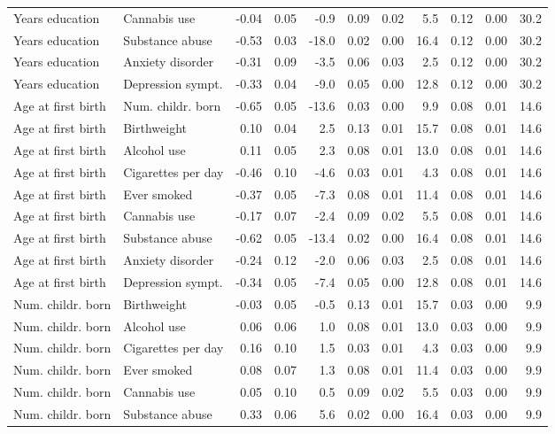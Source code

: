 {\begin{longtable}{llrrrrrrrrr}
  Years education & Cannabis use & -0.04 & 0.05 & -0.9 & 0.09 & 0.02 & 5.5 & 0.12 & 0.00 & 30.2 \\ 
  Years education & Substance abuse & -0.53 & 0.03 & -18.0 & 0.02 & 0.00 & 16.4 & 0.12 & 0.00 & 30.2 \\ 
  Years education & Anxiety disorder & -0.31 & 0.09 & -3.5 & 0.06 & 0.03 & 2.5 & 0.12 & 0.00 & 30.2 \\ 
  Years education & Depression sympt. & -0.33 & 0.04 & -9.0 & 0.05 & 0.00 & 12.8 & 0.12 & 0.00 & 30.2 \\ 
  Age at first birth & Num. childr. born & -0.65 & 0.05 & -13.6 & 0.03 & 0.00 & 9.9 & 0.08 & 0.01 & 14.6 \\ 
  Age at first birth & Birthweight & 0.10 & 0.04 & 2.5 & 0.13 & 0.01 & 15.7 & 0.08 & 0.01 & 14.6 \\ 
  Age at first birth & Alcohol use & 0.11 & 0.05 & 2.3 & 0.08 & 0.01 & 13.0 & 0.08 & 0.01 & 14.6 \\ 
  Age at first birth & Cigarettes per day & -0.46 & 0.10 & -4.6 & 0.03 & 0.01 & 4.3 & 0.08 & 0.01 & 14.6 \\ 
  Age at first birth & Ever smoked & -0.37 & 0.05 & -7.3 & 0.08 & 0.01 & 11.4 & 0.08 & 0.01 & 14.6 \\ 
  Age at first birth & Cannabis use & -0.17 & 0.07 & -2.4 & 0.09 & 0.02 & 5.5 & 0.08 & 0.01 & 14.6 \\ 
  Age at first birth & Substance abuse & -0.62 & 0.05 & -13.4 & 0.02 & 0.00 & 16.4 & 0.08 & 0.01 & 14.6 \\ 
  Age at first birth & Anxiety disorder & -0.24 & 0.12 & -2.0 & 0.06 & 0.03 & 2.5 & 0.08 & 0.01 & 14.6 \\ 
  Age at first birth & Depression sympt. & -0.34 & 0.05 & -7.4 & 0.05 & 0.00 & 12.8 & 0.08 & 0.01 & 14.6 \\ 
  Num. childr. born & Birthweight & -0.03 & 0.05 & -0.5 & 0.13 & 0.01 & 15.7 & 0.03 & 0.00 & 9.9 \\ 
  Num. childr. born & Alcohol use & 0.06 & 0.06 & 1.0 & 0.08 & 0.01 & 13.0 & 0.03 & 0.00 & 9.9 \\ 
  Num. childr. born & Cigarettes per day & 0.16 & 0.10 & 1.5 & 0.03 & 0.01 & 4.3 & 0.03 & 0.00 & 9.9 \\ 
  Num. childr. born & Ever smoked & 0.08 & 0.07 & 1.3 & 0.08 & 0.01 & 11.4 & 0.03 & 0.00 & 9.9 \\ 
  Num. childr. born & Cannabis use & 0.05 & 0.10 & 0.5 & 0.09 & 0.02 & 5.5 & 0.03 & 0.00 & 9.9 \\ 
  Num. childr. born & Substance abuse & 0.33 & 0.06 & 5.6 & 0.02 & 0.00 & 16.4 & 0.03 & 0.00 & 9.9 \\ 

\end{longtable}}
